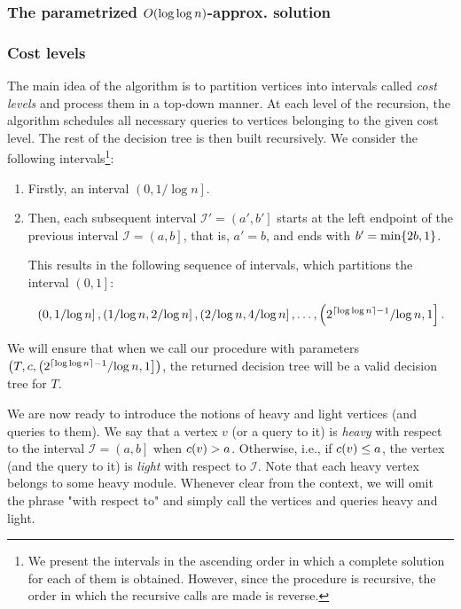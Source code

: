 \subsubsection{The parametrized $O\mathopen{}\left( \log\log n \right)$-approx. solution}\label{parametrizedSolution}
\subsubsection{Cost levels}\label{costLevels}
The main idea of the algorithm is to partition vertices into intervals called \textit{cost levels} and process them in a top-down manner. At each level of the recursion, the algorithm schedules all necessary queries to vertices belonging to the given cost level. The rest of the decision tree is then built recursively. We consider the following intervals\footnote{We present the intervals in the ascending order in which a complete solution for each of them is obtained. However, since the procedure is recursive, the order in which the recursive calls are made is reverse.}:

\begin{enumerate}
    \item Firstly, an interval $\left( 0,{1}/{\log n}\right]$.
    \item Then, each subsequent interval $\mathcal{I}'=\left(a',b'\right]$ starts at the left endpoint of the previous interval $\mathcal{I}=\left(a,b\right]$, that is, $a'=b$, and ends with $b'=\min\mathopen{}\left\{ 2b, 1 \right\}$. 
    
    This results in the following sequence of intervals, which partitions the interval $\left(0,1\right]$:
    
    $$\left( 0,{1}/{\log n}\right],\left({1}/{\log n},{2}/{\log n}\right], \left({2}/{\log n},{4}/{\log n}\right],\dots, \left({2^{\mathopen{}\left\lceil \log\log n \right\rceil-1}}/{\log n},1\right].$$
\end{enumerate}

We will ensure that when we call our procedure with parameters $\mathopen{}\left( T, c, \left({2^{\mathopen{}\left\lceil \log\log n \right\rceil-1}}/{\log n},1\right] \right)$, the returned decision tree will be a valid decision tree for $T$.

We are now ready to introduce the notions of heavy and light vertices (and queries to them). We say that a vertex $v$ (or a query to it) is \textit{heavy} with respect to the interval $\mathcal{I}=\left(a,b\right]$ when $c\mathopen{}\left( v \right)>a$. Otherwise, i.e., if $c\mathopen{}\left( v \right)\leq a$, the vertex (and the query to it) is \textit{light} with respect to $\mathcal{I}$. Note that each heavy vertex belongs to some heavy module. Whenever clear from the context, we will omit the phrase "with respect to" and simply call the vertices and queries heavy and light.



